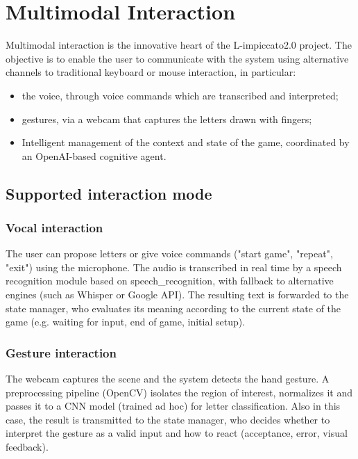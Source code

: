 \section{Multimodal Interaction}
Multimodal interaction is the innovative heart of the L-impiccato2.0 project. The objective is to enable the user to communicate with the system using alternative channels to traditional keyboard or mouse interaction, in particular:
\begin{itemize}
    \item the voice, through voice commands which are transcribed and interpreted;
    \item gestures, via a webcam that captures the letters drawn with fingers;
    \item Intelligent management of the context and state of the game, coordinated by an OpenAI-based cognitive agent.
\end{itemize}

\subsection{Supported interaction mode}
\subsubsection{Vocal interaction}
The user can propose letters or give voice commands ("start game", "repeat", "exit") using the microphone. The audio is transcribed in real time by a speech recognition module based on speech\_recognition, with fallback to alternative engines (such as Whisper or Google API).
The resulting text is forwarded to the state manager, who evaluates its meaning according to the current state of the game (e.g. waiting for input, end of game, initial setup).
\subsubsection{Gesture interaction}
The webcam captures the scene and the system detects the hand gesture. A preprocessing pipeline (OpenCV) isolates the region of interest, normalizes it and passes it to a CNN model (trained ad hoc) for letter classification. Also in this case, the result is transmitted to the state manager, who decides whether to interpret the gesture as a valid input and how to react (acceptance, error, visual feedback).

